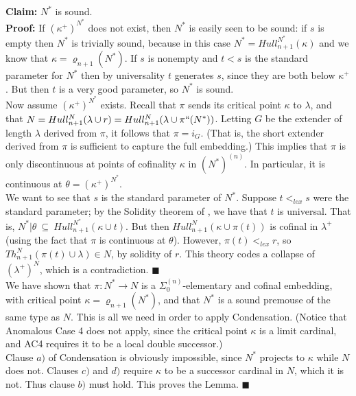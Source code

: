 \documentclass[12pt]{article}
\begin{document}
\textbf{Claim:} $N^*$ is sound.\\

\textbf{Proof:} If $(\kappa^+)^{N^*}$ does not exist, then $N^*$ is easily seen to be sound: if $s$ is empty then $N^*$ is trivially sound, because in this case $N^* = Hull_{n+1}^{N^*} (\kappa ) $ and we know that $\kappa = \varrho_{n+1} (N^* )$.  If $s$ is nonempty and $t < s$ is the standard parameter for $N^*$ then by universality $t$ generates $s$, since they are both below $\kappa^+$.  But then $t$ is a very good parameter, so $N^*$ is sound.\\

Now assume $(\kappa^+ )^{N^*}$ exists.  Recall that $\pi$ sends its critical point $\kappa$ to $\lambda$, and that $N = Hull_{n+1}^N (\lambda \cup r) = Hull_{n+1}^N (\lambda \cup \pi `` (N^*))$.  Letting $G$ be the extender of length $\lambda$ derived from $\pi$, it follows that $\pi = i_G$.  (That is, the short extender derived from $\pi$ is sufficient to capture the full embedding.)  This implies that $\pi$ is only discontinuous at points of cofinality $\kappa$ in $(N^*)^{(n)}$.  In particular, it is continuous at $\theta = (\kappa^+)^{N^*}$.\\
 
 We want to see that $s$ is the standard parameter of $N^*$.  Suppose $t <_{lex} s$ were the standard parameter; by the Solidity theorem of \cite{FSPIPM}, we have that $t$ is universal.  That is, $N^* | \theta \ \subseteq \ Hull_{n+1}^{N^*} (\kappa \cup t )$.  But then $Hull_{n+1}^N (\kappa \cup \pi (t))$ is cofinal in $\lambda^+$ (using the fact that $\pi$ is continuous at $\theta$).  However, $\pi (t) <_{lex} r$, so $Th_{n+1}^N (\pi (t) \cup \lambda ) \in N$, by solidity of $r$.  This theory codes a collapse of $(\lambda^+)^N$, which is a contradiction. $\blacksquare$\\

We have shown that $\pi : N^* \longrightarrow N$ is a $\Sigma_0^{(n)}$-elementary and cofinal embedding, with critical point $\kappa = \varrho_{n+1} (N^* )$, and that $N^*$ is a sound premouse of the same type as $N$.  This is all we need in order to apply Condensation.  (Notice that Anomalous Case 4 does not apply, since the critical point $\kappa$ is a limit cardinal, and AC4 requires it to be a local double successor.)\\

Clause $a)$ of Condensation is obviously impossible, since $N^*$ projects to $\kappa$ while $N$ does not. Clauses $c)$ and $d)$ require $\kappa$ to be a successor cardinal in $N$, which it is not.  Thus clause $b)$ must hold.  This proves the Lemma. $\blacksquare$\\
\end{document}
